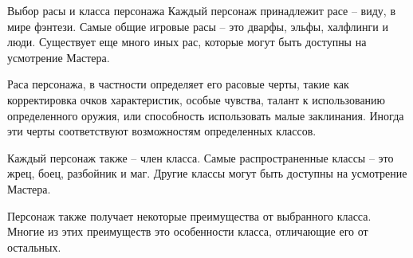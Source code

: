 \documentclass[12pt,a4paper,mathserif]{beamer}
\begin{document}
\begin{frame}{Выбор расы и класса персонажа}
    \setlength{\parindent}{0.5cm}
    Каждый персонаж принадлежит расе -- виду, в мире фэнтези. Самые общие игровые расы -- это дварфы, эльфы, халфлинги и люди. Существует еще много иных рас, которые могут быть доступны на усмотрение Мастера.
    
    Раса персонажа, в частности определяет его расовые черты, такие как корректировка очков характеристик, особые чувства, талант к использованию определенного оружия, или способность использовать малые заклинания. Иногда эти черты соответствуют возможностям определенных классов.
    
    Каждый персонаж также -- член класса. Самые распространенные классы -- это жрец, боец, разбойник и маг. Другие классы могут быть доступны на усмотрение Мастера.
    
    Персонаж также получает некоторые преимущества от выбранного класса. Многие из этих преимуществ это особенности класса, отличающие его от остальных.
\end{frame}
\end{document}
